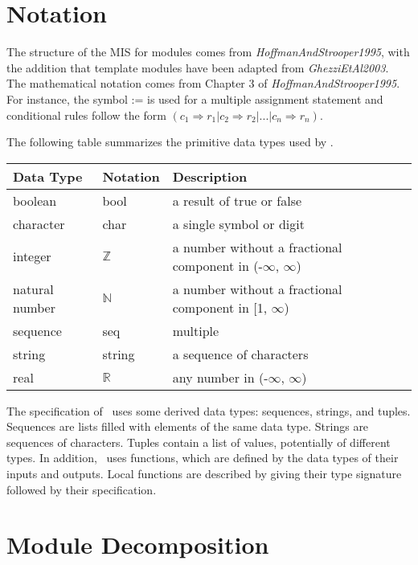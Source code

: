 \documentclass[12pt, titlepage]{article}
\begin{document}
\section{Notation}
The structure of the MIS for modules comes from \textit{HoffmanAndStrooper1995},
with the addition that template modules have been adapted from
\textit{GhezziEtAl2003}.  The mathematical notation comes from Chapter 3 of
\textit{HoffmanAndStrooper1995}.  For instance, the symbol := is used for a
multiple assignment statement and conditional rules follow the form $(c_1
\Rightarrow r_1 | c_2 \Rightarrow r_2 | ... | c_n \Rightarrow r_n )$.

The following table summarizes the primitive data types used by \progname. 

\begin{center}
\renewcommand{\arraystretch}{1.2}
\noindent 
\begin{tabular}{l l p{7.5cm}} 
\toprule 
\textbf{Data Type} & \textbf{Notation} & \textbf{Description}\\ 
\midrule
boolean & bool & a result of true or false\\
character & char & a single symbol or digit\\
integer & $\mathbb{Z}$ & a number without a fractional component in (-$\infty$, $\infty$) \\
natural number & $\mathbb{N}$ & a number without a fractional component in [1, $\infty$) \\
sequence & seq & multiple \\
string & string & a sequence of characters \\
real & $\mathbb{R}$ & any number in (-$\infty$, $\infty$)\\
\bottomrule
\end{tabular} 
\end{center}

\noindent
The specification of \progname \ uses some derived data types: sequences, strings, and
tuples. Sequences are lists filled with elements of the same data type. Strings
are sequences of characters. Tuples contain a list of values, potentially of
different types. In addition, \progname \ uses functions, which
are defined by the data types of their inputs and outputs. Local functions are
described by giving their type signature followed by their specification.

\section{Module Decomposition}
\end{document}
